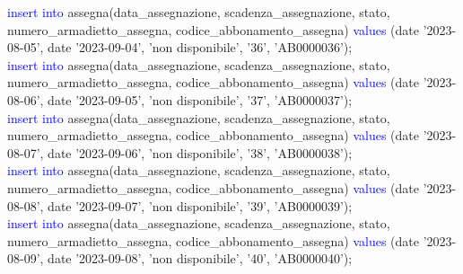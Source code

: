 \documentclass{article}
\begin{document}
\begin{flushleft}
{        \vspace{2mm}
        \hspace*{0.5em}\textcolor{blue}{insert into} assegna(data\_assegnazione, scadenza\_assegnazione, stato, \hspace*{0.5em}numero\_armadietto\_assegna, codice\_abbonamento\_assegna) \textcolor{blue}{values} \hspace*{0.5em}(date \hspace*{0.5em}'2023-08-05', date '2023-09-04', 'non disponibile', '36', 'AB0000036'); \\
        \vspace{2mm}
        \hspace*{0.5em}\textcolor{blue}{insert into} assegna(data\_assegnazione, scadenza\_assegnazione, stato, \hspace*{0.5em}numero\_armadietto\_assegna, codice\_abbonamento\_assegna) \textcolor{blue}{values} \hspace*{0.5em}(date \hspace*{0.5em}'2023-08-06', date '2023-09-05', 'non disponibile', '37', 'AB0000037'); \\
        \vspace{2mm}
        \hspace*{0.5em}\textcolor{blue}{insert into} assegna(data\_assegnazione, scadenza\_assegnazione, stato, \hspace*{0.5em}numero\_armadietto\_assegna, codice\_abbonamento\_assegna) \textcolor{blue}{values} \hspace*{0.5em}(date \hspace*{0.5em}'2023-08-07', date '2023-09-06', 'non disponibile', '38', 'AB0000038'); \\
        \vspace{2mm}
        \hspace*{0.5em}\textcolor{blue}{insert into} assegna(data\_assegnazione, scadenza\_assegnazione, stato, \hspace*{0.5em}numero\_armadietto\_assegna, codice\_abbonamento\_assegna) \textcolor{blue}{values} \hspace*{0.5em}(date \hspace*{0.5em}'2023-08-08', date '2023-09-07', 'non disponibile', '39', 'AB0000039'); \\
        \vspace{2mm}
        \hspace*{0.5em}\textcolor{blue}{insert into} assegna(data\_assegnazione, scadenza\_assegnazione, stato, \hspace*{0.5em}numero\_armadietto\_assegna, codice\_abbonamento\_assegna) \textcolor{blue}{values} \hspace*{0.5em}(date \hspace*{0.5em}'2023-08-09', date '2023-09-08', 'non disponibile', '40', 'AB0000040'); \\
}
\end{flushleft}
\end{document}
